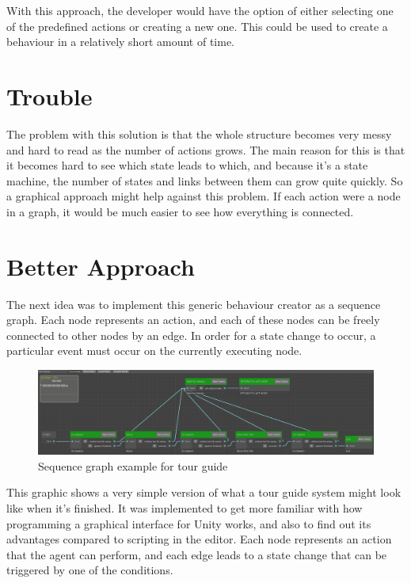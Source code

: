 With this approach, the developer would have the option of either selecting one of the predefined actions or creating a new one. This could be used to create a behaviour in a relatively short amount of time.

\newpage

\section{Trouble}
\label{sec:projectevolution_trouble}

The problem with this solution is that the whole structure becomes very messy and hard to read as the number of actions grows. The main reason for this is that it becomes hard to see which state leads to which, and because it's a state machine, the number of states and links between them can grow quite quickly. So a graphical approach might help against this problem. If each action were a node in a graph, it would be much easier to see how everything is connected.

\section{Better Approach}
\label{sec:projectevolution_betterapproach}

The next idea was to implement this generic behaviour creator as a sequence graph. Each node represents an action, and each of these nodes can be freely connected to other nodes by an edge. In order for a state change to occur, a particular event must occur on the currently executing node.

\begin{figure}[H]
	\centering
		\includegraphics[scale=0.34]{images/sequence_graph_tour_guide.png}
	\caption{Sequence graph example for tour guide}
	\label{fig:sequence_graph_tour_guide}
\end{figure}

This graphic shows a very simple version of what a tour guide system might look like when it's finished. It was implemented to get more familiar with how programming a graphical interface for Unity works, and also to find out its advantages compared to scripting in the editor. Each node represents an action that the agent can perform, and each edge leads to a state change that can be triggered by one of the conditions.


